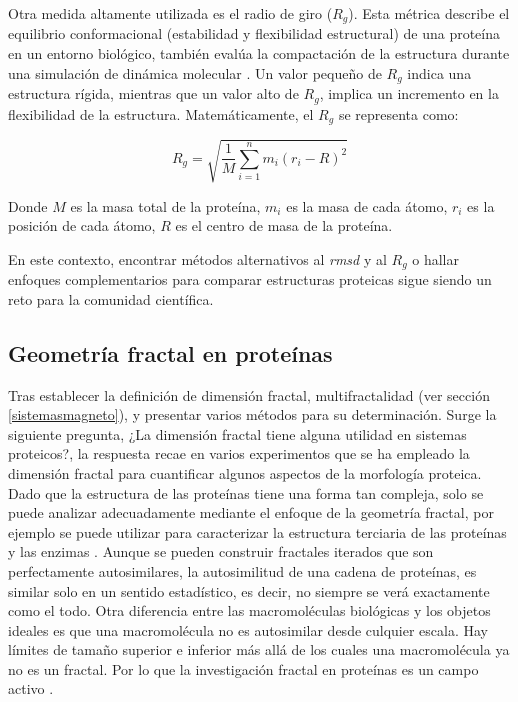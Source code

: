 Otra medida altamente utilizada es el radio de giro ($R_g$). Esta métrica describe el equilibrio conformacional (estabilidad y flexibilidad estructural) de una proteína en un entorno biológico, también evalúa la compactación de la estructura durante una simulación de dinámica molecular \cite{Saudagar2023}. Un valor pequeño de $R_g$ indica una estructura rígida, mientras que un valor alto de $R_g$, implica un incremento en la flexibilidad de la estructura. Matemáticamente, el $R_g$ se representa como:


\begin{equation}
	R_g = \sqrt{\frac{1}{M} \sum_{i=1}^{n} m_i \left( r_i - R \right)^2 }
	\label{rg}
\end{equation}

Donde $M$ es la masa total de la proteína, $m_i$ es la masa de cada átomo, $r_i$ es la posición de cada átomo, $R$ es el centro de masa de la proteína.

En este contexto, encontrar m\'{e}todos alternativos al \textit{rmsd} y al $R_g$ o hallar enfoques complementarios para comparar estructuras proteicas sigue siendo un reto para la comunidad cient\'{i}ﬁca.

\subsection{Geometr\'{i}a fractal en prote\'{i}nas}
\label{Gfp}

Tras establecer la definición de dimensión fractal, multifractalidad (ver sección \ref*{sistemasmagneto}), y presentar varios métodos para su determinación. Surge la siguiente pregunta, ¿La dimensi\'{o}n fractal tiene alguna utilidad en sistemas proteicos?, la respuesta recae en varios experimentos que se ha empleado la dimensión fractal para cuantificar algunos aspectos de la morfolog\'{i}a proteica. Dado que la estructura de las prote\'{i}nas tiene una forma tan compleja, solo se puede analizar adecuadamente mediante el enfoque de la geometr\'{i}a fractal, por ejemplo se puede utilizar para caracterizar la estructura terciaria de las prote\'{i}nas y las enzimas \cite{Mustafa1996}. Aunque se pueden construir fractales iterados que son perfectamente autosimilares, la autosimilitud de una cadena de prote\'{i}nas, es similar solo en un sentido estad\'{i}stico, es decir, no siempre se ver\'{a} exactamente como el todo. Otra diferencia entre las macromol\'{e}culas biol\'{o}gicas y los objetos ideales es que una macromol\'{e}cula no es autosimilar desde culquier escala. Hay l\'{i}mites de tamaño superior e inferior m\'{a}s all\'{a} de los cuales una macromol\'{e}cula ya no es un fractal. Por lo que la investigaci\'{o}n fractal en prote\'{i}nas es un campo activo \cite{Mustafa1996}. 

